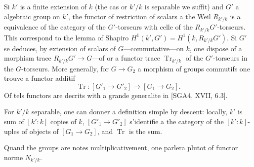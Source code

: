 \documentclass[12pt,a4paper]{article}
\theoremstyle{plain}
\theoremstyle{definition}
\theoremstyle{remark}
\DeclareMathOperator{\Tr}{Tr}
\begin{document}
Si $k'$ is a finite extension of $k$ (the cas or $k'/k$ is separable we suffit) and $G'$ a algebraic group on $k'$, the functor of restriction of scalars a the Weil $R_{k'/k}$ is a equivalence of the category of the $G'$-torseurs with celle of the $R_{k'/k}G'$-torseurs. This correspond to the lemma of Shapiro $H^1(k',G') = H^1(k,R_{k'/k}G')$. Si $G'$ se deduces, by extension of scalars of $G$---commutative---on $k$, one dispose of a morphism trace $R_{k'/k}G' \to G$---of or a functor trace $\Tr_{k'/k}$ of the $G'$-torseurs in the $G$-torseurs. More generally, for $G \to G_2$ a morphism of groups commutifs one trouve a functor additif
\begin{equation}\label{eq:2.4.6.1}
\Tr: [G'_1 \to G'_2] \to [G_1 \to G_2].
\end{equation}
Of tels functors are decrits with a grande generalite in [SGA4, XVII, 6.3].

For $k'/k$ separable, one can donner a definition simple by descent: locally, $k'$ is sum of $[k':k]$ copies of $k$, $[G'_1 \to G'_2]$ s'identifie a the category of the $[k':k]$-uples of objects of $[G_1 \to G_2]$, and $\Tr$ is the sum.

Quand the groups are notes multiplicativement, one parlera plutot of functor norme $N_{k'/k}$.

\subsubsection{}
\end{document}
